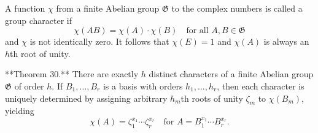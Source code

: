 A function $\chi$ from a finite Abelian group $\mathfrak{G}$ to the complex numbers is called a group character if
$$\chi(AB) = \chi(A) \cdot \chi(B) \quad \text{for all } A, B \in \mathfrak{G}$$
and $\chi$ is not identically zero. It follows that $\chi(E) = 1$ and $\chi(A)$ is always an $h$th root of unity.

**Theorem 30.** There are exactly $h$ distinct characters of a finite Abelian group $\mathfrak{G}$ of order $h$. If $B_1, \ldots, B_r$ is a basis with orders $h_1, \ldots, h_r$, then each character is uniquely determined by assigning arbitrary $h_m$th roots of unity $\zeta_m$ to $\chi(B_m)$, yielding
$$\chi(A) = \zeta_1^{x_1} \cdots \zeta_r^{x_r} \quad \text{for } A = B_1^{x_1} \cdots B_r^{x_r}.$$
